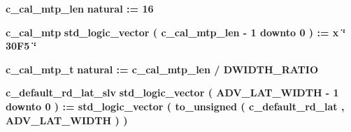 \begin{DoxyCompactItemize}
\item 
{\bf c\+\_\+cal\+\_\+mtp\+\_\+len} {\bfseries \textcolor{comment}{natural}\textcolor{vhdlchar}{ }\textcolor{vhdlchar}{ }\textcolor{vhdlchar}{\+:}\textcolor{vhdlchar}{=}\textcolor{vhdlchar}{ }\textcolor{vhdlchar}{ } \textcolor{vhdldigit}{16} \textcolor{vhdlchar}{ }} 
\item 
{\bf c\+\_\+cal\+\_\+mtp} {\bfseries \textcolor{comment}{std\+\_\+logic\+\_\+vector}\textcolor{vhdlchar}{ }\textcolor{vhdlchar}{(}\textcolor{vhdlchar}{ }\textcolor{vhdlchar}{ }\textcolor{vhdlchar}{ }\textcolor{vhdlchar}{ }{\bfseries {\bf c\+\_\+cal\+\_\+mtp\+\_\+len}} \textcolor{vhdlchar}{-\/}\textcolor{vhdlchar}{ } \textcolor{vhdldigit}{1} \textcolor{vhdlchar}{ }\textcolor{keywordflow}{downto}\textcolor{vhdlchar}{ }\textcolor{vhdlchar}{ } \textcolor{vhdldigit}{0} \textcolor{vhdlchar}{ }\textcolor{vhdlchar}{)}\textcolor{vhdlchar}{ }\textcolor{vhdlchar}{ }\textcolor{vhdlchar}{ }\textcolor{vhdlchar}{\+:}\textcolor{vhdlchar}{=}\textcolor{vhdlchar}{ }\textcolor{vhdlchar}{ }\textcolor{vhdlchar}{x}\textcolor{vhdlchar}{ }\textcolor{keyword}{\char`\"{} 30\+F5 \char`\"{}}\textcolor{vhdlchar}{ }} 
\item 
{\bf c\+\_\+cal\+\_\+mtp\+\_\+t} {\bfseries \textcolor{comment}{natural}\textcolor{vhdlchar}{ }\textcolor{vhdlchar}{ }\textcolor{vhdlchar}{\+:}\textcolor{vhdlchar}{=}\textcolor{vhdlchar}{ }\textcolor{vhdlchar}{ }\textcolor{vhdlchar}{ }\textcolor{vhdlchar}{ }{\bfseries {\bf c\+\_\+cal\+\_\+mtp\+\_\+len}} \textcolor{vhdlchar}{/}\textcolor{vhdlchar}{ }\textcolor{vhdlchar}{ }\textcolor{vhdlchar}{ }{\bfseries {\bf D\+W\+I\+D\+T\+H\+\_\+\+R\+A\+T\+IO}} \textcolor{vhdlchar}{ }} 
\item 
{\bf c\+\_\+default\+\_\+rd\+\_\+lat\+\_\+slv} {\bfseries \textcolor{comment}{std\+\_\+logic\+\_\+vector}\textcolor{vhdlchar}{ }\textcolor{vhdlchar}{(}\textcolor{vhdlchar}{ }\textcolor{vhdlchar}{ }\textcolor{vhdlchar}{ }\textcolor{vhdlchar}{ }{\bfseries {\bf A\+D\+V\+\_\+\+L\+A\+T\+\_\+\+W\+I\+D\+TH}} \textcolor{vhdlchar}{-\/}\textcolor{vhdlchar}{ } \textcolor{vhdldigit}{1} \textcolor{vhdlchar}{ }\textcolor{keywordflow}{downto}\textcolor{vhdlchar}{ }\textcolor{vhdlchar}{ } \textcolor{vhdldigit}{0} \textcolor{vhdlchar}{ }\textcolor{vhdlchar}{)}\textcolor{vhdlchar}{ }\textcolor{vhdlchar}{ }\textcolor{vhdlchar}{ }\textcolor{vhdlchar}{\+:}\textcolor{vhdlchar}{=}\textcolor{vhdlchar}{ }\textcolor{vhdlchar}{ }\textcolor{vhdlchar}{ }\textcolor{vhdlchar}{ }\textcolor{comment}{std\+\_\+logic\+\_\+vector}\textcolor{vhdlchar}{ }\textcolor{vhdlchar}{(}\textcolor{vhdlchar}{ }\textcolor{vhdlchar}{to\+\_\+unsigned}\textcolor{vhdlchar}{ }\textcolor{vhdlchar}{(}\textcolor{vhdlchar}{ }\textcolor{vhdlchar}{ }\textcolor{vhdlchar}{ }\textcolor{vhdlchar}{ }{\bfseries {\bf c\+\_\+default\+\_\+rd\+\_\+lat}} \textcolor{vhdlchar}{ }\textcolor{vhdlchar}{,}\textcolor{vhdlchar}{ }\textcolor{vhdlchar}{ }\textcolor{vhdlchar}{ }\textcolor{vhdlchar}{ }{\bfseries {\bf A\+D\+V\+\_\+\+L\+A\+T\+\_\+\+W\+I\+D\+TH}} \textcolor{vhdlchar}{ }\textcolor{vhdlchar}{)}\textcolor{vhdlchar}{ }\textcolor{vhdlchar}{ }\textcolor{vhdlchar}{ }\textcolor{vhdlchar}{)}\textcolor{vhdlchar}{ }} 

\end{DoxyCompactItemize}
